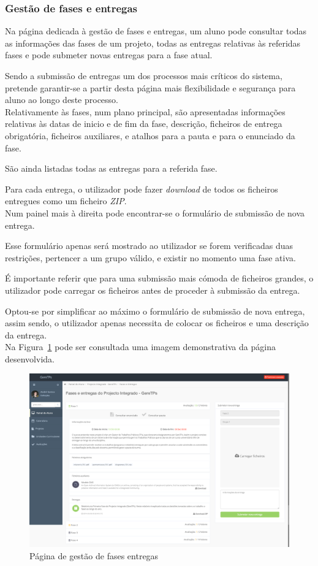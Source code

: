 \subsubsection{Gestão de fases e entregas}

Na página dedicada à gestão de fases e entregas, um aluno pode consultar todas as informações das fases de um projeto, todas as entregas relativas às referidas fases e pode submeter novas entregas para a fase atual.

Sendo a submissão de entregas um dos processos mais críticos do sistema, pretende garantir-se a partir desta página mais flexibilidade e segurança para aluno ao longo deste processo.\\

Relativamente às fases, num plano principal, são apresentadas informações relativas às datas de inicio e de fim da fase, descrição, ficheiros de entrega obrigatória, ficheiros auxiliares, e atalhos para a pauta e para o enunciado da fase.

São ainda listadas todas as entregas para a referida fase.

Para cada entrega, o utilizador pode fazer \textit{download} de todos os ficheiros entregues como um ficheiro \textit{ZIP}.\\

Num painel mais à direita pode encontrar-se o formulário de submissão de nova entrega.

Esse formulário apenas será mostrado ao utilizador se forem verificadas duas restrições, pertencer a um grupo válido, e existir no momento uma fase ativa.

É importante referir que para uma submissão mais cómoda de ficheiros grandes, o utilizador pode carregar os ficheiros antes de proceder à submissão da entrega.

Optou-se por simplificar ao máximo o formulário de submissão de nova entrega, assim sendo, o utilizador apenas necessita de colocar os ficheiros e uma descrição da entrega.\\

Na Figura~\ref{fig:student_deliveries} pode ser consultada uma imagem demonstrativa da página desenvolvida.

\begin{figure}[H]
  \centering
  \includegraphics[width=1\textwidth,center]{images/implementacao/alunos/deliveries}
  \caption{Página de gestão de fases entregas}
  \label{fig:student_deliveries}
\end{figure}
